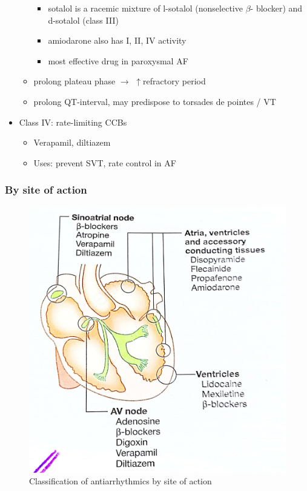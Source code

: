 \documentclass[
  12pt,
]{memoir}
\providecommand{\tightlist}{%
  \setlength{\itemsep}{0pt}\setlength{\parskip}{0pt}}
\begin{document}
\begin{itemize}
\begin{itemize}
    \begin{itemize}
    \tightlist
    \item
      sotalol is a racemic mixture of l-sotalol (nonselective \(\beta\)-
      blocker) and d-sotalol (class III)
    \item
      amiodarone also has I, II, IV activity
    \item
      most effective drug in paroxysmal AF
    \end{itemize}
  \item
    prolong plateau phase \(\rightarrow\) \(\uparrow\)refractory period
  \item
    prolong QT-interval, may predispose to torsades de pointes / VT
  \end{itemize}
\item
  Class IV: rate-limiting CCBs

  \begin{itemize}
  \tightlist
  \item
    Verapamil, diltiazem
  \item
    Uses: prevent SVT, rate control in AF
  \end{itemize}
\end{itemize}

\hypertarget{by-site-of-action}{%
\subsubsection{By site of action}\label{by-site-of-action}}

\begin{figure}[h!]
    \centering
    \includegraphics[width=.7\textwidth]{../assets/med/antiarrhythmic.jpg}
    \vspace{4mm}
    \caption{Classification of antiarrhythmics by site of action}
\end{figure}
\end{document}
